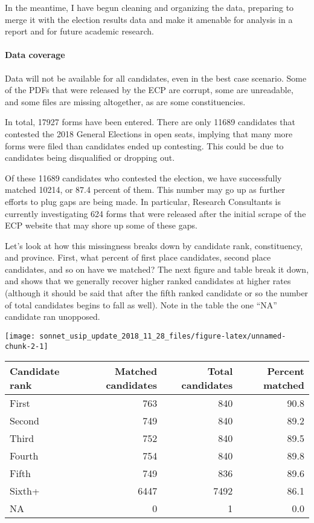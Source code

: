 \documentclass[]{article}
\let\oldparagraph\paragraph
\renewcommand{\paragraph}[1]{\oldparagraph{#1}\mbox{}}
\begin{document}
In the meantime, I have begun cleaning and organizing the data,
preparing to merge it with the election results data and make it
amenable for analysis in a report and for future academic research.

\paragraph{Data coverage}\label{data-coverage}

Data will not be available for all candidates, even in the best case
scenario. Some of the PDFs that were released by the ECP are corrupt,
some are unreadable, and some files are missing altogether, as are some
constituencies.

In total, 17927 forms have been entered. There are only 11689 candidates
that contested the 2018 General Elections in open seats, implying that
many more forms were filed than candidates ended up contesting. This
could be due to candidates being disqualified or dropping out.

Of these 11689 candidates who contested the election, we have
successfully matched 10214, or 87.4 percent of them. This number may go
up as further efforts to plug gaps are being made. In particular,
Research Consultants is currently investigating 624 forms that were
released after the initial scrape of the ECP website that may shore up
some of these gaps.

Let's look at how this missingness breaks down by candidate rank,
constituency, and province. First, what percent of first place
candidates, second place candidates, and so on have we matched? The next
figure and table break it down, and shows that we generally recover
higher ranked candidates at higher rates (although it should be said
that after the fifth ranked candidate or so the number of total
candidates begins to fall as well). Note in the table the one ``NA''
candidate ran unopposed.

\begin{center}\texttt{[image: sonnet\_usip\_update\_2018\_11\_28\_files/figure-latex/unnamed-chunk-2-1]} \end{center}

\begin{longtable}[]{@{}lrrr@{}}
\toprule
Candidate rank & Matched candidates & Total candidates & Percent
matched\tabularnewline
\midrule
\endhead
First & 763 & 840 & 90.8\tabularnewline
Second & 749 & 840 & 89.2\tabularnewline
Third & 752 & 840 & 89.5\tabularnewline
Fourth & 754 & 840 & 89.8\tabularnewline
Fifth & 749 & 836 & 89.6\tabularnewline
Sixth+ & 6447 & 7492 & 86.1\tabularnewline
NA & 0 & 1 & 0.0\tabularnewline
\bottomrule
\end{longtable}
\end{document}
